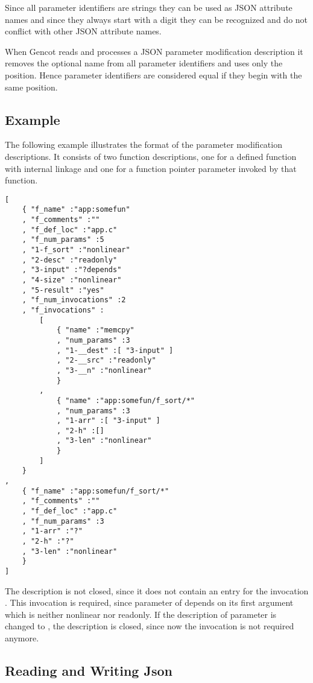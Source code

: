 Since all parameter identifiers are strings they can be used as JSON attribute names and since they always
start with a digit they can be recognized and do not conflict with other JSON attribute names. 

When Gencot reads and processes a JSON parameter modification description it removes the optional name from 
all parameter identifiers and uses only the position. Hence parameter identifiers are considered equal if they
begin with the same position.

\subsection{Example}

The following example illustrates the format of the parameter modification descriptions. It consists of two
function descriptions, one for a defined function with internal linkage and one for a function pointer parameter
invoked by that function.
\begin{verbatim}
[
    { "f_name" :"app:somefun" 
    , "f_comments" :"" 
    , "f_def_loc" :"app.c" 
    , "f_num_params" :5
    , "1-f_sort" :"nonlinear" 
    , "2-desc" :"readonly" 
    , "3-input" :"?depends" 
    , "4-size" :"nonlinear" 
    , "5-result" :"yes" 
    , "f_num_invocations" :2
    , "f_invocations" :
        [ 
            { "name" :"memcpy" 
            , "num_params" :3
            , "1-__dest" :[ "3-input" ]
            , "2-__src" :"readonly" 
            , "3-__n" :"nonlinear" 
            } 
        , 
            { "name" :"app:somefun/f_sort/*" 
            , "num_params" :3
            , "1-arr" :[ "3-input" ]
            , "2-h" :[]
            , "3-len" :"nonlinear" 
            } 
        ] 
    } 
, 
    { "f_name" :"app:somefun/f_sort/*"
    , "f_comments" :"" 
    , "f_def_loc" :"app.c" 
    , "f_num_params" :3
    , "1-arr" :"?" 
    , "2-h" :"?" 
    , "3-len" :"nonlinear" 
    } 
]
\end{verbatim}
The description is not closed, since it does not contain an entry for the invocation . This
invocation is required, since parameter  of  depends on its first argument
which is neither nonlinear nor readonly. If the description of parameter  is changed
to , the description is closed, since now the invocation  is not required
anymore.

\subsection{Reading and Writing Json}
\label{impl-parmod-json}

